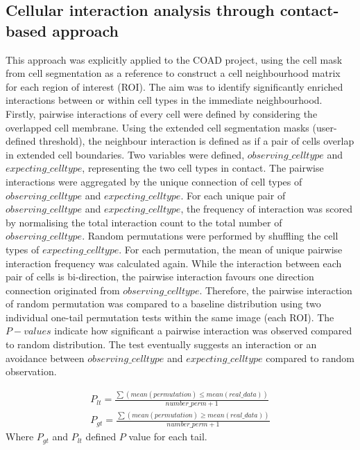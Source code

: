 \subsection{Cellular interaction analysis through contact-based approach}
This approach was explicitly applied to the COAD project, using the cell mask from cell segmentation as a reference to construct a cell neighbourhood matrix for each region of interest (ROI). The aim was to identify significantly enriched interactions between or within cell types in the immediate neighbourhood. Firstly, pairwise interactions of every cell were defined by considering the overlapped cell membrane. Using the extended cell segmentation masks (user-defined threshold), the neighbour interaction is defined as if a pair of cells overlap in extended cell boundaries. Two variables were defined, $observing\_celltype$ and $expecting\_celltype$, representing the two cell types in contact. The pairwise interactions were aggregated by the unique connection of cell types of $observing\_celltype$ and $expecting\_celltype$. For each unique pair of $observing\_celltype$ and $expecting\_celltype$, the frequency of interaction was scored by normalising the total interaction count to the total number of $observing\_celltype$. Random permutations were performed by shuffling the cell types of $expecting\_celltype$. For each permutation, the mean of unique pairwise interaction frequency was calculated again. While the interaction between each pair of cells is bi-direction, the pairwise interaction favours one direction connection originated from $observing\_celltype$. Therefore, the pairwise interaction of random permutation was compared to a baseline distribution using two individual one-tail permutation tests within the same image (each ROI). The $P-values$ indicate how significant a pairwise interaction was observed compared to random distribution. The test eventually suggests an interaction or an avoidance between $observing\_celltype$ and $expecting\_celltype$ compared to random observation.

\begin{equation}
\begin{split}
P_{lt} = \frac{ \sum(mean(permutation) \leq mean(real\_data) )}{number\_perm + 1} \\
P_{gt} = \frac{\sum(mean(permutation) \geq mean(real\_data) )}{number\_perm + 1}
\label{chap1:eq:02}
\end{split}
\end{equation}
Where $P_{gt}$ and $P_{lt}$ defined $P$ value for each tail.

